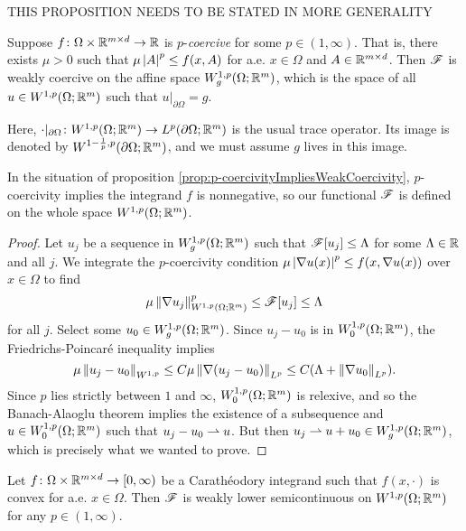 {\color{red} THIS PROPOSITION NEEDS TO BE STATED IN MORE GENERALITY}
\begin{proposition} \label{prop:p-coercivityImpliesWeakCoercivity}
    Suppose $f \colon \Omega \times \mathbb{R}^{m \times d} \to \mathbb{R}$ is $p$-\textit{coercive} for some $p \in (1,\infty)$. That is, there exists $\mu > 0$ such that $\mu \left\lvert {A} \right\rvert^p \leq f(x,A)$ for a.e. $x \in \Omega$ and $A \in \mathbb{R}^{m\times d}$. Then $\mathscr{F}$ is weakly coercive on the affine space $W_g^{1,p}(\Omega;\mathbb{R}^m)$, which is the space of all $u \in W^{1,p}(\Omega;\mathbb{R}^m)$ such that $u\vert_{\partial\Omega} = g$.
\end{proposition}
Here, $\cdot\vert_{\partial\Omega} \colon W^{1,p}(\Omega;\mathbb{R}^m) \to L^p(\partial\Omega;\mathbb{R}^m)$ is the usual trace operator. Its image is denoted by $W^{1-\frac{1}{p},p}(\partial\Omega;\mathbb{R}^m)$, and we must assume $g$ lives in this image.
\begin{remark}
    In the situation of proposition \ref{prop:p-coercivityImpliesWeakCoercivity}, $p$-coercivity implies the integrand $f$ is nonnegative, so our functional $\mathscr{F}$ is defined on the whole space $W^{1,p}(\Omega;\mathbb{R}^m)$.
\end{remark}
\begin{proof}
    Let $u_j$ be a sequence in $W^{1,p}_g(\Omega;\mathbb{R}^m)$ such that $\mathscr{F}[u_j] \leq \Lambda$ for some $\Lambda \in \mathbb{R}$ and all $j$. We integrate the $p$-coercivity condition $\mu\left\lvert {\nabla u(x)} \right\rvert^p \leq f(x,\nabla u(x))$ over $x \in \Omega$ to find 
    \begin{equation}
        \mu\left\lVert {\nabla u_j} \right\rVert^p_{W^{1,p}(\Omega;\mathbb{R}^m)} \leq \mathscr{F}[u_j] \leq \Lambda
    \end{equation}
    for all $j$. Select some $u_0 \in W^{1,p}_g(\Omega;\mathbb{R}^m)$. Since $u_j - u_0$ is in $W^{1,p}_0(\Omega;\mathbb{R}^m)$, the Friedrichs-Poincar\'e inequality implies 
    \begin{equation}
        \mu\left\lVert {u_j - u_0} \right\rVert_{W^{1,p}} \leq C\mu \left\lVert {\nabla(u_j - u_0)} \right\rVert_{L^p} \leq C(\Lambda + \left\lVert {\nabla u_0} \right\rVert_{L^p}).
    \end{equation}
    Since $p$ lies strictly between $1$ and $\infty$, $W^{1,p}_0(\Omega;\mathbb{R}^m)$ is relexive, and so the Banach-Alaoglu theorem implies the existence of a subsequence and $u \in W^{1,p}_0(\Omega;\mathbb{R}^m)$ such that $u_j - u_0 \rightharpoonup u$. But then $u_j \rightharpoonup u + u_0 \in W^{1,p}_g(\Omega;\mathbb{R}^m)$, which is precisely what we wanted to prove.
\end{proof}
\begin{theorem} \label{thm:convexityImpliesWeakLowerSemicontinuity}
    Let $f \colon \Omega \times \mathbb{R}^{m \times d} \to [0,\infty)$ be a Carath\'e\-odory integrand such that $f(x,\cdot)$ is convex for a.e. $x \in \Omega$. Then $\mathscr{F}$ is weakly lower semicontinuous on $W^{1,p}(\Omega;\mathbb{R}^m)$ for any $p \in (1,\infty)$.
\end{theorem}
